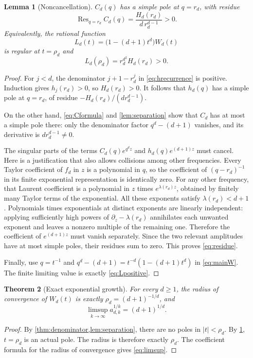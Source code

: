 \documentclass[11pt,letterpaper]{article}
\numberwithin{equation}{section}
\newtheorem{theorem}{Theorem}[section]
\newtheorem{lemma}[theorem]{Lemma}
\theoremstyle{definition}
\theoremstyle{remark}
\newcommand{\res}{\operatorname{Res}}
\begin{document}
\begin{lemma}[Noncancellation]\label{lem:noncancel}
$C_d(q)$ has a simple pole at $q=r_d$, with residue
\begin{equation}\label{eq:residue}
 \res_{q=r_d}C_d(q)=\frac{H_d(r_d)}{d\,r_d^{d-1}}>0.
\end{equation}
Equivalently, the rational function
\begin{equation}\label{eq:L}
 L_d(t)=\bigl(1-(d+1)t^d\bigr)W_d(t)
\end{equation}
is regular at $t=\rho_d$ and
\begin{equation}\label{eq:Lpositive}
 L_d(\rho_d)=r_d^{d^2}H_d(r_d)>0.
\end{equation}
\end{lemma}
\begin{proof}
For $j<d$, the denominator $j+1-r_d^j$ in \eqref{eq:hrecurrence}
is positive. Induction gives $h_j(r_d)>0$, so $H_d(r_d)>0$.
It follows that $h_d(q)$ has a simple pole at $q=r_d$, of residue
$-H_d(r_d)/(d r_d^{d-1})$.

On the other hand, \eqref{eq:Cformula} and
\cref{lem:separation} show that $C_d$ has at most a simple pole there:
only the denominator factor $q^d-(d+1)$ vanishes, and its derivative is
$d r_d^{d-1}\ne0$.

The singular parts of the terms
$C_d(q)e^{q^dz}$ and $h_d(q)e^{(d+1)z}$ must cancel.
Here is a justification that also allows collisions among other
frequencies. Every Taylor coefficient of $f_d$ in $z$ is a polynomial
in $q$, so the coefficient of $(q-r_d)^{-1}$ in its finite exponential
representation is identically zero. For any other frequency, that
Laurent coefficient is a polynomial in $z$ times
$e^{\lambda(r_d)z}$, obtained by finitely many Taylor terms of the
exponential. All these exponents satisfy $\lambda(r_d)<d+1$.
Polynomials times exponentials at distinct exponents are linearly
independent: applying sufficiently high powers of
$\partial_z-\lambda(r_d)$ annihilates each unwanted exponent and
leaves a nonzero multiple of the remaining one. Therefore the
coefficient of $e^{(d+1)z}$ must vanish separately. Since the two
relevant amplitudes have at most simple poles, their residues sum to
zero. This proves \eqref{eq:residue}.

Finally, use $q=t^{-1}$ and
$q^d-(d+1)=t^{-d}(1-(d+1)t^d)$ in \eqref{eq:mainW}.
The finite limiting value is exactly \eqref{eq:Lpositive}.
\end{proof}

\begin{theorem}[Exact exponential growth]\label{thm:radius}
For every $d\ge1$, the radius of convergence of $W_d(t)$ is exactly
$\rho_d=(d+1)^{-1/d}$, and
\begin{equation}\label{eq:limsup}
 \limsup_{k\to\infty} a_{d,k}^{1/k}=(d+1)^{1/d}.
\end{equation}
\end{theorem}
\begin{proof}
By \cref{thm:denominator,lem:separation}, there are no poles in
$|t|<\rho_d$. By \cref{lem:noncancel}, $t=\rho_d$ is an actual pole.
The radius is therefore exactly $\rho_d$.
The coefficient formula for the radius of convergence gives
\eqref{eq:limsup}.
\end{proof}
\end{document}
